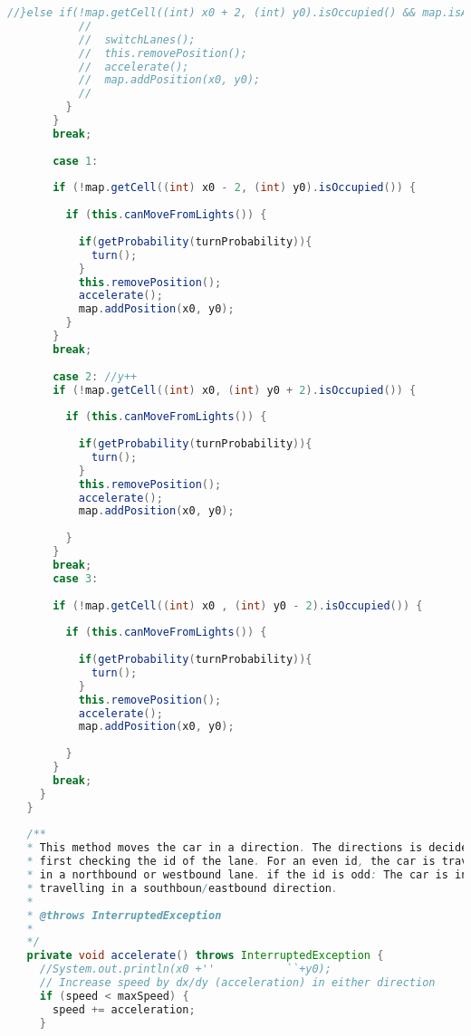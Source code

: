 \begin{lstlisting}[language=java]
           //}else if(!map.getCell((int) x0 + 2, (int) y0).isOccupied() && map.isAgentBeside((int)x0, (int) y0,getLane().getDirection())){ 
           //  
           //  switchLanes();
           //  this.removePosition();
           //  accelerate();
           //  map.addPosition(x0, y0);
           // 
         }
       }
       break;
       
       case 1:
       
       if (!map.getCell((int) x0 - 2, (int) y0).isOccupied()) {
         
         if (this.canMoveFromLights()) {
           
           if(getProbability(turnProbability)){
             turn();
           }
           this.removePosition();
           accelerate();
           map.addPosition(x0, y0);
         }
       }
       break;
       
       case 2: //y++
       if (!map.getCell((int) x0, (int) y0 + 2).isOccupied()) {
         
         if (this.canMoveFromLights()) {
           
           if(getProbability(turnProbability)){
             turn();
           }
           this.removePosition();
           accelerate();
           map.addPosition(x0, y0);
           
         }
       }
       break;
       case 3:
       
       if (!map.getCell((int) x0 , (int) y0 - 2).isOccupied()) {
         
         if (this.canMoveFromLights()) {
           
           if(getProbability(turnProbability)){
             turn();
           }
           this.removePosition();
           accelerate();
           map.addPosition(x0, y0);
           
         }
       }
       break;
     }
   }
   
   /**
   * This method moves the car in a direction. The directions is decided by
   * first checking the id of the lane. For an even id, the car is travelling
   * in a northbound or westbound lane. if the id is odd: The car is in a lane
   * travelling in a southboun/eastbound direction.
   * 
   * @throws InterruptedException
   * 
   */
   private void accelerate() throws InterruptedException {
     //System.out.println(x0 +''           ``+y0);
     // Increase speed by dx/dy (acceleration) in either direction
     if (speed < maxSpeed) {
       speed += acceleration;
     }
     

\end{lstlisting}
